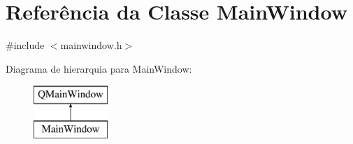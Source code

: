 \hypertarget{class_main_window}{}\section{Referência da Classe Main\+Window}
\label{class_main_window}


{\ttfamily \#include $<$mainwindow.\+h$>$}

Diagrama de hierarquia para Main\+Window\+:\begin{figure}[H]
\begin{center}
\leavevmode
\includegraphics[height=2.000000cm]{class_main_window}
\end{center}
\end{figure}

